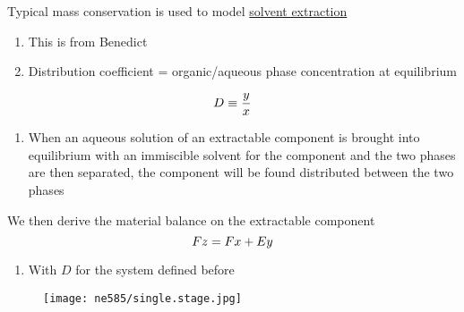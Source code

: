 \documentclass[aspectratio=1610,pdftex,dvipsnames,compress,xcolor={dvipsnames}]{beamer}
\begin{document}
\begin{frame}{Typical mass conservation is used to model \href{https://uidaho.pressbooks.pub/nuclearengineering/chapter/countercurrent-solvent-extraction/}{solvent extraction}}
    
    \begin{enumerate}[topsep=0pt,itemsep=18pt,leftmargin=*,label=(\arabic*)]
        \item[]This is from Benedict
        \item[]Distribution coefficient = organic/aqueous phase concentration at equilibrium
    \end{enumerate}

    \vspace*{\fill}

    \begin{equation}
        \LARGE
        D \equiv \frac{y}{x}
    \end{equation}

    \vspace*{\fill}

    \begin{enumerate}[topsep=0pt,itemsep=18pt,leftmargin=*,label=(\arabic*)]
        \item[]When an aqueous solution of an extractable component is brought into equilibrium with an immiscible solvent for the component and the two phases are then separated, the component will be found distributed between the two phases
    \end{enumerate}
\end{frame}


\begin{frame}{We then derive the material balance on the extractable component}
    \begin{equation}
        \LARGE
        Fz = Fx + Ey
    \end{equation}
    
    \vspace*{\fill}

    \begin{enumerate}[topsep=0pt,itemsep=18pt,leftmargin=*,label=(\arabic*)]
        \item[]With $D$ for the system defined before
    \end{enumerate}
\end{frame}


\begin{frame}{}
    \begin{figure}
        \centering
        \texttt{[image: ne585/single.stage.jpg]}
    \end{figure}
\end{frame}
\end{document}
